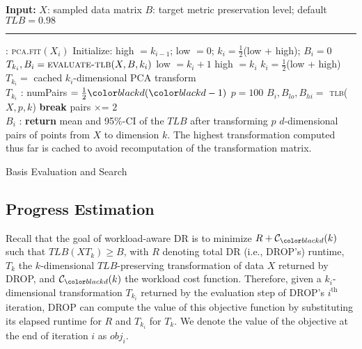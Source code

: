 \begin{algorithm}
\begin{algorithmic}[1]
\small
\Statex \textbf{Input:}  
\Statex $X$: sampled data matrix
\Statex $B$: target metric preservation level; default $TLB = 0.98$
\Statex  \hrule 
{}: \label{eq:basis}
	\State \textsc{pca.fit}$(X_i)$
	\State Initialize: high $= k_{i-1}$; low $=0$; $k_i= \frac{1}{2}$(low + high); $B_i = 0$
		\State $T_{k_i}, B_i  = \textsc{evaluate-tlb}( X, B, k_i)$
		  low $= k_i + 1$ 
		\Else  \hspace{0pt} high $= k_i $
		\EndIf
		\State $k_i = \frac{1}{2}$(low + high)
	\EndWhile
	\State $T_{k_i} = $ cached $k_i$-dimensional PCA transform\\
	\Return $T_{k_i}$
\EndFunction
\Statex 
{}: \label{eq:eval}
	\State numPairs $= \frac{1}{2}\mvar(\mvar-1)$
	\State $p = 100$
		\State $B_i, B_{lo}, B_{hi} = $ \textsc{tlb}($ X, p, k$)
			 \label{eq:paircheck}
		   \textbf{break}
		\Else \hspace{0pt} pairs $\times$= $ 2$
		\EndIf
	\EndWhile
	\\\Return $B_i$	
\EndFunction
\Statex 
{}: \label{eq:tlbeval}
	\State \textbf{return } mean and 95\%-CI of the $TLB$ after transforming $p$ $d$-dimensional pairs of points from $X$ to dimension $k$. The highest transformation computed thus far is cached to avoid recomputation of the transformation matrix.
\EndFunction

\end{algorithmic}
\caption{Basis Evaluation and Search}
\label{alg:candidate}
\end{algorithm}


\subsection{Progress Estimation}
\label{subsec:pest}

Recall that the goal of workload-aware DR is to minimize $R + \mathcal{C}_\mvar(k)$ such that $TLB(XT_k) \geq B$, with $R$ denoting total DR (i.e., DROP's) runtime, $T_k$ the $k$-dimensional $TLB$-preserving transformation of data $X$ returned by DROP, and $\mathcal{C}_\mvar(k)$ the workload cost function. 
Therefore, given a $k_i$-dimensional transformation $T_{k_i}$ returned by the evaluation step of DROP's $i^{\text{th}}$ iteration, DROP can compute the value of this objective function by substituting its elapsed runtime for $R$ and $T_{k_i}$ for $T_k$.  
We denote the value of the objective at the end of iteration $i$ as $obj_i$. 

